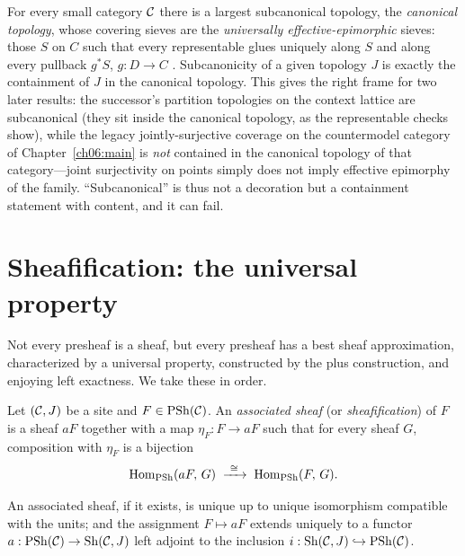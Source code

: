 \begin{remark}\label{ch04:rem:canonical}
For every small category $\mathcal{C}$ there is a largest subcanonical topology, the
\emph{canonical topology}, whose covering sieves are the \emph{universally
effective-epimorphic} sieves: those $S$ on $C$ such that every representable
glues uniquely along $S$ and along every pullback $g^{*}S$, $g:D\to C$
\cite{maclane,johnstone}. Subcanonicity of a given topology $J$ is exactly
the containment of $J$ in the canonical topology. This gives the right frame
for two later results: the successor's partition topologies on the context
lattice are subcanonical (they sit inside the canonical topology, as the
representable checks show), while the legacy jointly-surjective coverage on
the countermodel category of Chapter~\ref{ch06:main} is \emph{not} contained
in the canonical topology of that category---joint surjectivity on points
simply does not imply effective epimorphy of the family. ``Subcanonical'' is
thus not a decoration but a containment statement with content, and it can
fail.
\end{remark}

\section{Sheafification: the universal property}\label{ch04:sec:sheafification}

Not every presheaf is a sheaf, but every presheaf has a best sheaf
approximation, characterized by a universal property, constructed by the plus
construction, and enjoying left exactness. We take these in order.

\begin{definition}\label{ch04:def:assoc}
Let $(\mathcal{C},J)$ be a site and $F\in\mathrm{PSh}(\mathcal{C})$. An \emph{associated sheaf} (or
\emph{sheafification}) of $F$ is a sheaf $aF$ together with a map
$\eta_F:F\to aF$ such that for every sheaf $G$, composition with $\eta_F$ is a
bijection
\[
\Hom_{\PSh}(aF,\,G)\;\xrightarrow{\ \cong\ }\;\Hom_{\PSh}(F,\,G).
\]
\end{definition}

\begin{proposition}\label{ch04:prop:uniqueness}
An associated sheaf, if it exists, is unique up to unique isomorphism
compatible with the units; and the assignment $F\mapsto aF$ extends uniquely
to a functor $a:\mathrm{PSh}(\mathcal{C})\to\mathrm{Sh}(\mathcal{C},J)$ left adjoint to the inclusion
$i:\mathrm{Sh}(\mathcal{C},J)\hookrightarrow\mathrm{PSh}(\mathcal{C})$.
\end{proposition}

